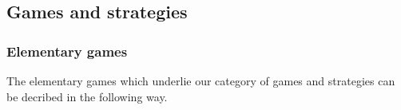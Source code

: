 %
%
%
%
%
%


\subsection{Games and strategies} %

\subsubsection{Elementary games} %

The elementary games which underlie
our category of games and strategies
can be decribed in the following way.

